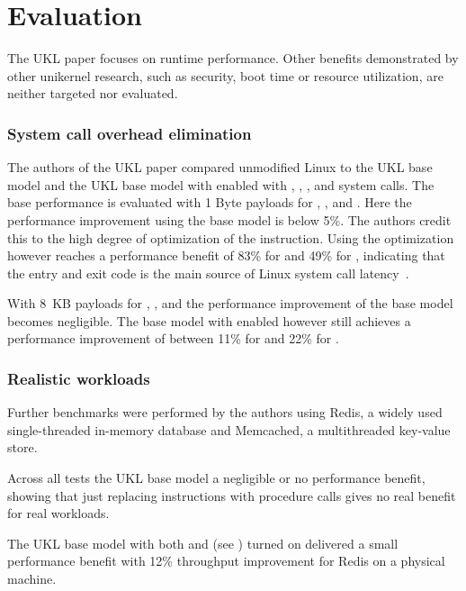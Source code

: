 \documentclass[10pt,twocolumn,a4paper]{article}
\begin{document}
\section{Evaluation}\label{sec:evaluation}
  The UKL paper focuses on runtime performance.
  Other benefits demonstrated by other unikernel research, such as security, boot time or
  resource utilization, are neither targeted nor evaluated.
  
  \subsubsection{System call overhead elimination}
    The authors of the UKL paper compared unmodified Linux to the UKL base model
    and the UKL base model with  enabled with , ,
    ,  and  system calls.
    The base performance is evaluated with 1 Byte payloads for ,
    ,  and .
    Here the performance improvement using the base model is below 5\%.
    The authors credit this to the high degree of optimization of the 
    instruction.
    Using the  optimization however reaches a performance benefit of
    83\% for  and 49\% for , indicating that the entry
    and exit code is the main source of Linux system call latency~\cite{raza23}.

    With 8~KB payloads for , ,  and 
    the performance improvement of the base model becomes negligible. 
    The base model with  enabled however still achieves a performance 
    improvement of between 11\% for  and 22\% for .

  \subsubsection{Realistic workloads}
    Further benchmarks were performed by the authors using Redis, a widely used single-threaded 
    in-memory database and Memcached, a multithreaded key-value store.

    Across all tests the UKL base model a negligible or no performance benefit,
    showing that just replacing  instructions with procedure calls
    gives no real benefit for real workloads.

    The UKL base model with both  and 
    (see ) turned on delivered a small performance
    benefit with 12\% throughput improvement for Redis on a physical machine.
\end{document}
